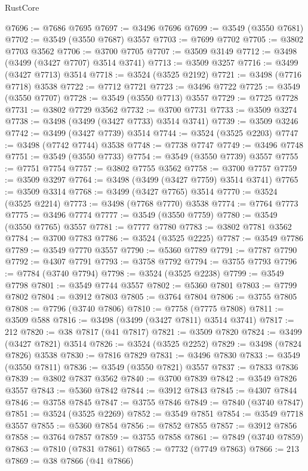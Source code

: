 \begin{lexlean}{RustCore}
\begin{coremodule}
@7696 := @7686 @7695
@7697 := @3496 @7696
@7699 := @3549 (@3550 @7681)
@7702 := @3549 (@3550 @7687) @3557
@7703 := @7699 @7702
@7705 := @3802 @7703 @3562
@7706 := @3700 @7705
@7707 := @3509 @3149
@7712 := @3498 (@3499 (@3427 @7707) @3514 @3741)
@7713 := @3509 @3257
@7716 := @3499 (@3427 @7713) @3514
@7718 := @3524 (@3525 @2192)
@7721 := @3498 (@7716 @7718) @3538
@7722 := @7712 @7721
@7723 := @3496 @7722
@7725 := @3549 (@3550 @7707)
@7728 := @3549 (@3550 @7713) @3557
@7729 := @7725 @7728
@7731 := @3802 @7729 @3562
@7732 := @3700 @7731
@7733 := @3509 @3274
@7738 := @3498 (@3499 (@3427 @7733) @3514 @3741)
@7739 := @3509 @3246
@7742 := @3499 (@3427 @7739) @3514
@7744 := @3524 (@3525 @2203)
@7747 := @3498 (@7742 @7744) @3538
@7748 := @7738 @7747
@7749 := @3496 @7748
@7751 := @3549 (@3550 @7733)
@7754 := @3549 (@3550 @7739) @3557
@7755 := @7751 @7754
@7757 := @3802 @7755 @3562
@7758 := @3700 @7757
@7759 := @3509 @3297
@7764 := @3498 (@3499 (@3427 @7759) @3514 @3741)
@7765 := @3509 @3314
@7768 := @3499 (@3427 @7765) @3514
@7770 := @3524 (@3525 @2214)
@7773 := @3498 (@7768 @7770) @3538
@7774 := @7764 @7773
@7775 := @3496 @7774
@7777 := @3549 (@3550 @7759)
@7780 := @3549 (@3550 @7765) @3557
@7781 := @7777 @7780
@7783 := @3802 @7781 @3562
@7784 := @3700 @7783
@7786 := @3524 (@3525 @2225)
@7787 := @3549 @7786
@7789 := @3549 @7770 @3557
@7790 := @5360 @7789
@7791 := @7787 @7790
@7792 := @4307 @7791
@7793 := @3758 @7792
@7794 := @3755 @7793
@7796 := @7784 (@3740 @7794)
@7798 := @3524 (@3525 @2238)
@7799 := @3549 @7798
@7801 := @3549 @7744 @3557
@7802 := @5360 @7801
@7803 := @7799 @7802
@7804 := @3912 @7803
@7805 := @3764 @7804
@7806 := @3755 @7805
@7808 := @7796 (@3740 @7806)
@7810 := @7758 (@7775 @7808)
@7811 := @3509 @588
@7816 := @3498 (@3499 (@3427 @7811) @3514 @3741)
@7817 := 212
@7820 := @38 @7817 (@41 @7817)
@7821 := @3509 @7820
@7824 := @3499 (@3427 @7821) @3514
@7826 := @3524 (@3525 @2252)
@7829 := @3498 (@7824 @7826) @3538
@7830 := @7816 @7829
@7831 := @3496 @7830
@7833 := @3549 (@3550 @7811)
@7836 := @3549 (@3550 @7821) @3557
@7837 := @7833 @7836
@7839 := @3802 @7837 @3562
@7840 := @3700 @7839
@7842 := @3549 @7826 @3557
@7843 := @5360 @7842
@7844 := @3912 @7843
@7845 := @4307 @7844
@7846 := @3758 @7845
@7847 := @3755 @7846
@7849 := @7840 (@3740 @7847)
@7851 := @3524 (@3525 @2269)
@7852 := @3549 @7851
@7854 := @3549 @7718 @3557
@7855 := @5360 @7854
@7856 := @7852 @7855
@7857 := @3912 @7856
@7858 := @3764 @7857
@7859 := @3755 @7858
@7861 := @7849 (@3740 @7859)
@7863 := @7810 (@7831 @7861)
@7865 := @7732 (@7749 @7863)
@7866 := 213
@7869 := @38 @7866 (@41 @7866)

\end{coremodule}
\end{lexlean}
